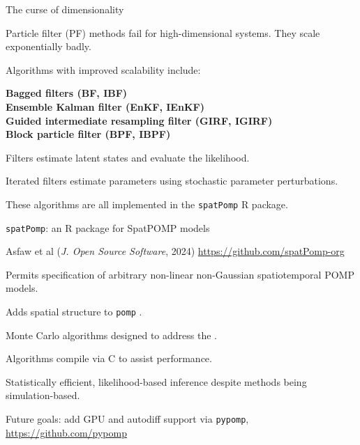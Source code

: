 \documentclass{beamer}
\begin{document}
\begin{frame}{The curse of dimensionality}

  \bi
  \item
    Particle filter (PF) methods fail for high-dimensional systems. They scale exponentially badly.

    \vspace{2mm}
    
  \item Algorithms with improved scalability include:\\

    \vspace{1mm}
    
  {\bf
  Bagged filters (BF, IBF)\\
  Ensemble Kalman filter (EnKF, IEnKF)\\
  Guided intermediate resampling filter (GIRF, IGIRF)\\
  Block particle filter (BPF, IBPF)\\
  }

      \vspace{2mm}

\item Filters estimate latent states and evaluate the likelihood.

    \vspace{2mm}

  \item Iterated filters estimate parameters using stochastic parameter perturbations.

        \vspace{2mm}

\item These algorithms are all implemented in the \texttt{spatPomp} R package.
  
  \ei
  
\end{frame}

\begin{frame}{\texttt{spatPomp}: an R package for SpatPOMP models}

  Asfaw et al ({\it J. Open Source Software}, 2024)
  \url{https://github.com/spatPomp-org}
  
  \bi
\item Permits specification of arbitrary non-linear non-Gaussian spatiotemporal POMP models.
\item Adds spatial structure to \texttt{pomp} \citep{king16}.
\item Monte Carlo algorithms designed to address the .
  \item Algorithms compile via C to assist performance.
\item Statistically efficient, likelihood-based inference despite methods being simulation-based.
  \ei

  Future goals: add GPU and autodiff support via \texttt{pypomp}, \url{https://github.com/pypomp}
  
\end{frame}
\end{document}
